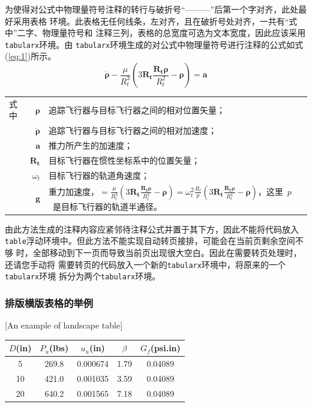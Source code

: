 为使得对公式中物理量符号注释的转行与破折号“———”后第一个字对齐，此处最好采用表格
环境。此表格无任何线条，左对齐，且在破折号处对齐，一共有“式中”二字、物理量符号和
注释三列，表格的总宽度可选为文本宽度，因此应该采用\verb|tabularx|环境。由
\verb|tabularx|环境生成的对公式中物理量符号进行注释的公式如式(\ref{eq:1})所示。
\begin{equation}\label{eq:1}
\ddot{\boldsymbol{\rho}}-\frac{\mu}{R_{t}^{3}}\left(3\mathbf{R_{t}}\frac{\mathbf{R_{t}\rho}}{R_{t}^{2}}-\boldsymbol{\rho}\right)=\mathbf{a}
\end{equation}
\begin{tabularx}{\textwidth}{@{}l@{\quad}r@{———}X@{}}
式中& $\boldsymbol{\rho}$ &追踪飞行器与目标飞行器之间的相对位置矢量；\\
&  $\boldsymbol{\ddot{\rho}}$&追踪飞行器与目标飞行器之间的相对加速度；\\
&  $\mathbf{a}$   &推力所产生的加速度；\\
&  $\mathbf{R_t}$ & 目标飞行器在惯性坐标系中的位置矢量；\\
&  $\omega_{t}$ & 目标飞行器的轨道角速度；\\
&  $\mathbf{g}$ & 重力加速度，$=\frac{\mu}{R_{t}^{3}}\left(
3\mathbf{R_{t}}\frac{\mathbf{R_{t}\rho}}{R_{t}^{2}}-\boldsymbol{\rho}\right)=\omega_{t}^{2}\frac{R_{t}}{p}\left(
3\mathbf{R_{t}}\frac{\mathbf{R_{t}\rho}}{R_{t}^{2}}-\boldsymbol{\rho}\right)$，这里~$p$~是目标飞行器的轨道半通径。
\end{tabularx}\vspace{3.15bp}
由此方法生成的注释内容应紧邻待注释公式并置于其下方，因此不能将代码放入
\verb|table|浮动环境中。但此方法不能实现自动转页接排，可能会在当前页剩余空间不够
时，全部移动到下一页而导致当前页出现很大空白。因此在需要转页处理时，还请您手动将
需要转页的代码放入一个新的\verb|tabularx|环境中，将原来的一个\verb|tabularx|环境
拆分为两个\verb|tabularx|环境。

\subsubsection{排版横版表格的举例}[An example of landscape table]

\begin{table}[p]
\centering
\begin{sideways}
\begin{minipage}{\textheight}
\vspace{0.5em}\centering\wuhao
\begin{tabular}{ccccc}
\toprule[1.5pt]
$D$(in) & $P_u$(lbs) & $u_u$(in) & $\beta$ & $G_f$(psi.in)\\
\midrule[1pt]
 5 & 269.8 & 0.000674 & 1.79 & 0.04089\\
10 & 421.0 & 0.001035 & 3.59 & 0.04089\\
20 & 640.2 & 0.001565 & 7.18 & 0.04089\\
\bottomrule[1.5pt]
\end{tabular}
\end{minipage}
\end{sideways}
\end{table}


